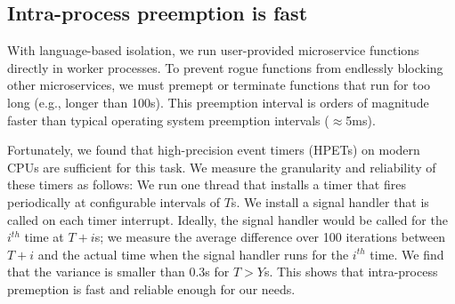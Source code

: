 \subsection{Intra-process preemption is fast}
With language-based isolation, we run user-provided microservice functions
directly in worker processes. To prevent rogue functions from endlessly blocking
other microservices, we must premept or terminate functions that run for too
long (e.g., longer than 100\textmu{}s).  This
preemption interval is orders of magnitude faster than typical operating
system preemption intervals ($\approx$5ms).

Fortunately, we found that high-precision event timers (HPETs) on modern CPUs
are sufficient for this task. We measure the granularity and reliability of
these timers as follows: We run one thread that installs a timer that fires
periodically at configurable intervals of $T$\textmu{}s. We install a signal
handler that is called on each timer interrupt. Ideally, the signal handler
would be called for the $i^{th}$ time at $T + i$\textmu{}s; we measure the
average difference over 100 iterations between $T + i$ and the actual time
when the signal handler runs for the $i^{th}$ time. We find that the variance
is smaller than 0.3\textmu{}s for $T > Y$\textmu{}s. This shows that
intra-process premeption is fast and reliable enough for our needs.
